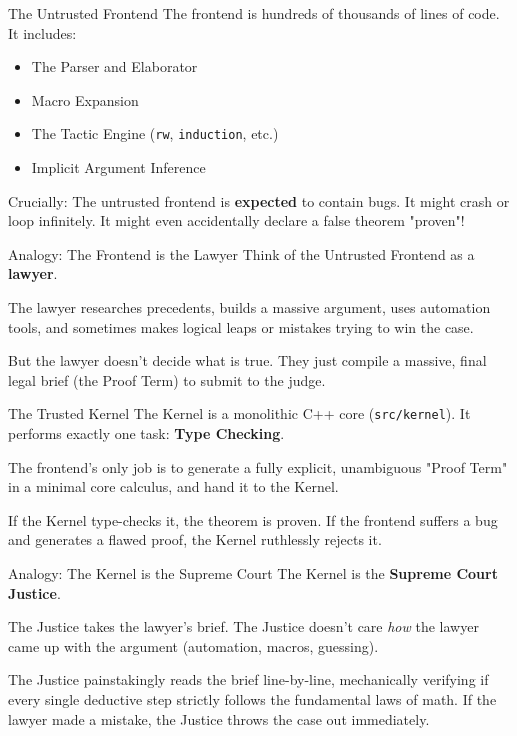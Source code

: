 \documentclass[10pt,aspectratio=169]{beamer}
\begin{document}
\begin{frame}[fragile]{The Untrusted Frontend}
    The frontend is hundreds of thousands of lines of code. It includes:
    \begin{itemize}
        \item The Parser and Elaborator
        \item Macro Expansion
        \item The Tactic Engine (\verb|rw|, \verb|induction|, etc.)
        \item Implicit Argument Inference
    \end{itemize}
    
    Crucially: The untrusted frontend is \textbf{expected} to contain bugs. It might crash or loop infinitely. It might even accidentally declare a false theorem "proven"!
\end{frame}

\begin{frame}[fragile]{Analogy: The Frontend is the Lawyer}
    Think of the Untrusted Frontend as a \textbf{lawyer}.
    
    \vspace{1em}
    The lawyer researches precedents, builds a massive argument, uses automation tools, and sometimes makes logical leaps or mistakes trying to win the case. 
    
    \vspace{1em}
    But the lawyer doesn't decide what is true. They just compile a massive, final legal brief (the Proof Term) to submit to the judge.
\end{frame}

\begin{frame}[fragile]{The Trusted Kernel}
    The Kernel is a monolithic C++ core (\verb|src/kernel|). It performs exactly one task: \textbf{Type Checking}.
    
    The frontend's only job is to generate a fully explicit, unambiguous "Proof Term" in a minimal core calculus, and hand it to the Kernel.
    
    If the Kernel type-checks it, the theorem is proven. If the frontend suffers a bug and generates a flawed proof, the Kernel ruthlessly rejects it.
\end{frame}

\begin{frame}[fragile]{Analogy: The Kernel is the Supreme Court}
    The Kernel is the \textbf{Supreme Court Justice}.
    
    \vspace{1em}
    The Justice takes the lawyer's brief. The Justice doesn't care \textit{how} the lawyer came up with the argument (automation, macros, guessing). 
    
    \vspace{1em}
    The Justice painstakingly reads the brief line-by-line, mechanically verifying if every single deductive step strictly follows the fundamental laws of math. If the lawyer made a mistake, the Justice throws the case out immediately.
\end{frame}
\end{document}
